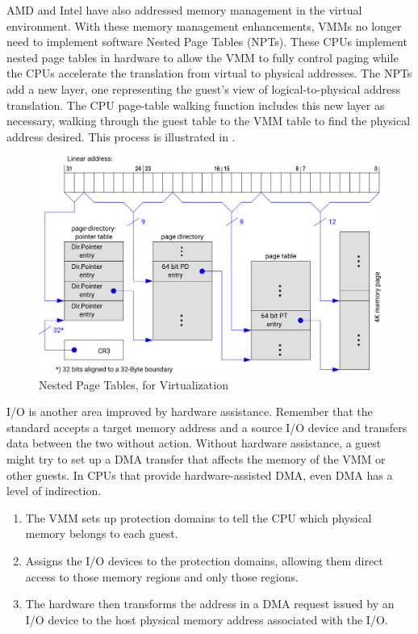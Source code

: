 AMD and Intel have also addressed memory management in the virtual environment.
With these memory management enhancements, VMMs no longer need to implement software Nested Page Tables (NPTs).
These CPUs implement nested page tables in hardware to allow the VMM to fully control paging while the CPUs accelerate the translation from virtual to physical addresses.
The NPTs add a new layer, one representing the guest's view of logical-to-physical address translation.
The CPU page-table walking function includes this new layer as necessary, walking through the guest table to the VMM table to find the physical address desired.
This process is illustrated in .

\begin{figure}[h!tbp]
  \centering
  \includegraphics[scale=1.00]{./Drawings/EDAF35-Operating_Systems/Nested_Page_Tables-Virtualization.png}
  \caption{Nested Page Tables, for Virtualization}
  \label{fig:Nested_Page_Tables}
\end{figure}

I/O is another area improved by hardware assistance.
Remember that the standard  accepts a target memory address and a source I/O device and transfers data between the two without  action.
Without hardware assistance, a guest might try to set up a DMA transfer that affects the memory of the VMM or other guests.
In CPUs that provide hardware-assisted DMA, even DMA has a level of indirection.
\begin{enumerate}[noitemsep]
\item The VMM sets up protection domains to tell the CPU which physical memory belongs to each guest.
\item Assigns the I/O devices to the protection domains, allowing them direct access to those memory regions and only those regions.
\item The hardware then transforms the address in a DMA request issued by an I/O device to the host physical memory address associated with the I/O.
\end{enumerate}


